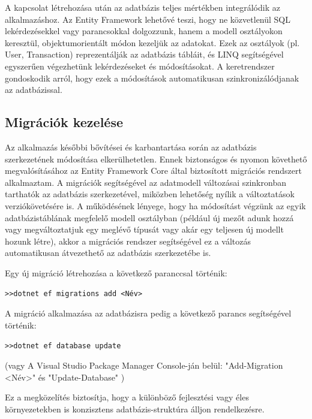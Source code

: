 A kapcsolat létrehozása után az adatbázis teljes mértékben integrálódik az alkalmazáshoz. Az  Entity Framework lehetővé teszi, hogy ne közvetlenül SQL lekérdezésekkel vagy parancsokkal dolgozzunk, hanem a modell osztályokon keresztül, objektumorientált módon kezeljük az adatokat. Ezek az osztályok (pl. User, Transaction) reprezentálják az adatbázis tábláit, és LINQ segítségével egyszerűen végezhetünk lekérdezéseket és módosításokat. A keretrendszer gondoskodik arról, hogy ezek a módosítások automatikusan szinkronizálódjanak az adatbázissal.

\subsection{Migrációk kezelése}

Az alkalmazás későbbi bővítései és karbantartása során az adatbázis szerkezetének módosítása elkerülhetetlen. Ennek biztonságos és nyomon követhető megvalósításához az Entity Framework Core által biztosított migrációs rendszert alkalmaztam. A migrációk segítségével az adatmodell változásai szinkronban tarthatók az adatbázis szerkezetével, miközben lehetőség nyílik a változtatások verziókövetésére is. A működésének lényege, hogy ha módosítást végzünk az egyik adatbázistáblának megfelelő modell osztályban (például új mezőt adunk hozzá vagy megváltoztatjuk egy meglévő típusát vagy akár egy teljesen új modellt hozunk létre), akkor a migrációs rendszer segítségével ez a változás automatikusan átvezethető az adatbázis szerkezetébe is.

Egy új migráció létrehozása a következő paranccsal történik:

\texttt{>>dotnet ef migrations add <Név>}

A migráció alkalmazása az adatbázisra pedig a következő parancs segítségével történik:

\texttt{>>dotnet ef database update}

(vagy A Visual Studio Package Manager Console-ján belül:
"Add-Migration <Név>"
és
"Update-Database"
)

Ez a megközelítés biztosítja, hogy a különböző fejlesztési vagy éles környezetekben is konzisztens adatbázis-struktúra álljon rendelkezésre.

